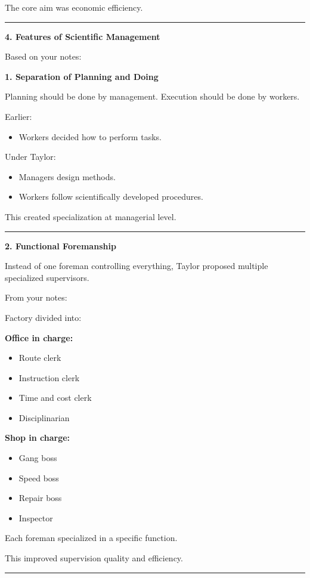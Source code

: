 \documentclass[10pt,a4paper]{article}
\newcommand{\separator}{\vspace{0.4em}\noindent\rule{\linewidth}{0.6pt}\vspace{0.4em}}
\begin{document}
The core aim was economic efficiency.

\separator

\textbf{4. Features of Scientific Management}

Based on your notes:

\textbf{1. Separation of Planning and Doing}

Planning should be done by management.
Execution should be done by workers.

Earlier:
\begin{itemize}
  \item Workers decided how to perform tasks.
\end{itemize}

Under Taylor:
\begin{itemize}
  \item Managers design methods.
  \item Workers follow scientifically developed procedures.
\end{itemize}

This created specialization at managerial level.

\separator

\textbf{2. Functional Foremanship}

Instead of one foreman controlling everything, Taylor proposed multiple specialized
supervisors.

From your notes:

Factory divided into:

\textbf{Office in charge:}
\begin{itemize}
  \item Route clerk
  \item Instruction clerk
  \item Time and cost clerk
  \item Disciplinarian
\end{itemize}

\textbf{Shop in charge:}
\begin{itemize}
  \item Gang boss
  \item Speed boss
  \item Repair boss
  \item Inspector
\end{itemize}

Each foreman specialized in a specific function.

This improved supervision quality and efficiency.

\separator
\end{document}

